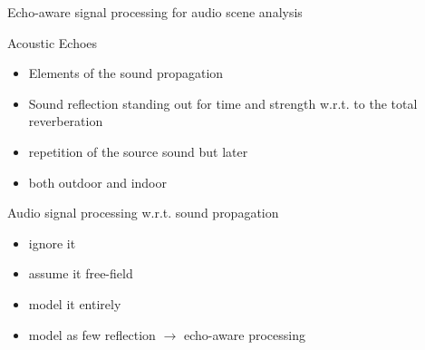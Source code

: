 \begin{frame}[t]{\alert{Echo-aware signal processing for audio scene analysis}}

    \begin{mydefblock}{Acoustic Echoes}
        \begin{itemize}
            \item Elements of the sound propagation
            \item Sound reflection standing out for time and strength w.r.t. to the total reverberation
            \item repetition of the source sound but later
            \item both outdoor and indoor
        \end{itemize}
    \end{mydefblock}

    \vfill
    \begin{block}{}
        Audio signal processing w.r.t. sound propagation~\cite{chen1993time}
        \begin{itemize}
            \item ignore it
            \item assume it free-field
            \item model it entirely
            \item model as few reflection $\rightarrow$ echo-aware processing
        \end{itemize}

    \end{block}




\end{frame}
